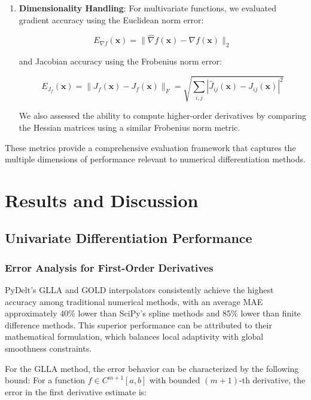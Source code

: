\documentclass[10pt,journal,compsoc]{IEEEtran}
\begin{document}
\begin{enumerate}
    \item \textbf{Dimensionality Handling}: For multivariate functions, we evaluated gradient accuracy using the Euclidean norm error:
    
    \begin{equation}
        E_{\nabla f}(\mathbf{x}) = \|\hat{\nabla}f(\mathbf{x}) - \nabla f(\mathbf{x})\|_2
    \end{equation}
    
    and Jacobian accuracy using the Frobenius norm error:
    
    \begin{equation}
        E_{J_f}(\mathbf{x}) = \|\hat{J}_f(\mathbf{x}) - J_f(\mathbf{x})\|_F = \sqrt{\sum_{i,j}|\hat{J}_{ij}(\mathbf{x}) - J_{ij}(\mathbf{x})|^2}
    \end{equation}
    
    We also assessed the ability to compute higher-order derivatives by comparing the Hessian matrices using a similar Frobenius norm metric.
\end{enumerate}

These metrics provide a comprehensive evaluation framework that captures the multiple dimensions of performance relevant to numerical differentiation methods.

\section{Results and Discussion}

\subsection{Univariate Differentiation Performance}

\subsubsection{Error Analysis for First-Order Derivatives}

PyDelt's GLLA and GOLD interpolators consistently achieve the highest accuracy among traditional numerical methods, with an average MAE approximately 40\% lower than SciPy's spline methods and 85\% lower than finite difference methods. This superior performance can be attributed to their mathematical formulation, which balances local adaptivity with global smoothness constraints.

For the GLLA method, the error behavior can be characterized by the following bound: For a function $f \in C^{m+1}[a,b]$ with bounded $(m+1)$-th derivative, the error in the first derivative estimate is:
\end{document}
